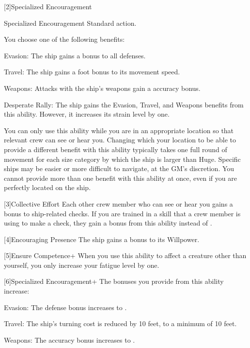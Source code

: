         [2]{Specialized Encouragement}
        \begin{activeability}{Specialized Encouragement}
            \abilityusagetime Standard action.
            \rankline

            You choose one of the following benefits:
            \begin{raggeditemize}
                \item Evasion: The ship  gains a  bonus to all defenses.
                \item Travel: The ship  gains a  foot bonus to its movement speed.
                \item Weapons: Attacks with the ship's weapons  gain a  accuracy bonus.
                \item Desperate Rally: The ship  gains the Evasion, Travel, and Weapons benefits from this ability.
                    However, it increases its strain level by one.
            \end{raggeditemize}

            You can only use this ability while you are in an appropriate location so that relevant crew can see or hear you.
            Changing which your location to be able to provide a different benefit with this ability typically takes one full round of movement for each size category by which the ship is larger than Huge.
            Specific ships may be easier or more difficult to navigate, at the GM's discretion.
            You cannot provide more than one benefit with this ability at once, even if you are perfectly located on the ship.
        \end{activeability}

        [3]{Collective Effort} Each other crew member who can see or hear you gains a  bonus to ship-related checks.
        If you are trained in a skill that a crew member is using to make a check, they gain a  bonus from this ability instead of .

        [4]{Encouraging Presence} The ship gains a  bonus to its Willpower.

        [5]{Ensure Competence+} When you use this ability to affect a creature other than yourself, you only increase your fatigue level by one.

        [6]{Specialized Encouragement+} The bonuses you provide from this ability increase:
        \begin{raggeditemize}
            \item Evasion: The defense bonus increases to .
            \item Travel: The ship's turning cost is reduced by 10 feet, to a minimum of 10 feet.
            \item Weapons: The accuracy bonus increases to .
        \end{raggeditemize}

